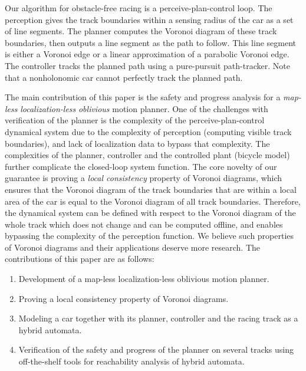 Our algorithm for obstacle-free racing is a perceive-plan-control loop.
%
The perception gives the track boundaries within a sensing radius of the car as a set of line segments.
%
The planner computes the Voronoi diagram of these track boundaries, then outputs a line segment as the path to follow.
%
This line segment is either a Voronoi edge or a linear approximation of a parabolic Voronoi edge.
%
The controller tracks the planned path using a pure-pursuit path-tracker.
%
Note that a nonholonomic car cannot perfectly track the planned path.



The main contribution of this paper is the safety and progress analysis for a \emph{map-less} \emph{localization-less} \emph{oblivious} motion planner.
%
One of the challenges with verification of the planner is the complexity of the perceive-plan-control dynamical system due to the complexity of perception (computing visible track boundaries), and lack of localization data to bypass that complexity.
%
The complexities of the planner, controller and the controlled plant (bicycle model) further complicate the closed-loop system function.
%
The core novelty of our guarantee is proving a \emph{local consistency} property of Voronoi diagrams, which ensures that the Voronoi diagram of the track boundaries that are within a local area of the car is equal to the Voronoi diagram of all track boundaries.
%
Therefore, the dynamical system can be defined with respect to the Voronoi diagram of the whole track which does not change and can be computed offline, and enables bypassing the complexity of the perception function.
%
We believe such properties of Voronoi diagrams and their applications deserve more research.
%
The contributions of this paper are as follows:
\begin{enumerate}
\item
Development of a map-less localization-less oblivious motion planner.
\item
Proving a local consistency property of Voronoi diagrams.
\item
Modeling a car together with its planner, controller and the racing track as a hybrid automata.
\item
Verification of the safety and progress of the planner on several tracks using off-the-shelf tools for reachability analysis of hybrid automata.
\end{enumerate}



